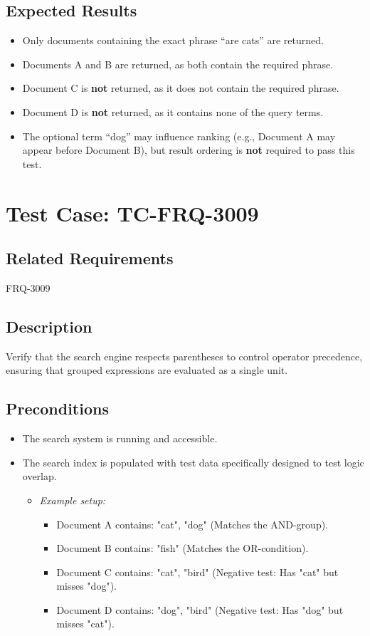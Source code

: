 \documentclass{article}
\begin{document}
\subsection*{Expected Results}
\begin{itemize}
  \item Only documents containing the exact phrase ``are cats'' are returned.
  \item Documents A and B are returned, as both contain the required phrase.
  \item Document C is \textbf{not} returned, as it does not contain the required phrase.
  \item Document D is \textbf{not} returned, as it contains none of the query terms.
  \item The optional term ``dog'' may influence ranking (e.g., Document A may appear before Document B), but result ordering is \textbf{not} required to pass this test.
\end{itemize}

\section{Test Case: TC-FRQ-3009}

\subsection*{Related Requirements}
FRQ-3009

\subsection*{Description}
Verify that the search engine respects parentheses to control operator precedence, 
ensuring that grouped \newline expressions are evaluated as a single unit.

\subsection*{Preconditions}
\begin{itemize} 
  \item The search system is running and accessible. 
  \item The search index is populated with test data specifically designed to test logic overlap. 
  
  \begin{itemize} 
    \item[] \textit{Example setup:}  \begin{itemize} 
    \item Document A contains: "cat", "dog" (Matches the AND-group). 
    \item Document B contains: "fish" (Matches the OR-condition). 
    \item Document C contains: "cat", "bird" (Negative test: Has "cat" but misses "dog"). 
    \item Document D contains: "dog", "bird" (Negative test: Has "dog" but misses "cat"). 
  \end{itemize}   \end{itemize} 
\end{itemize}
\end{document}
